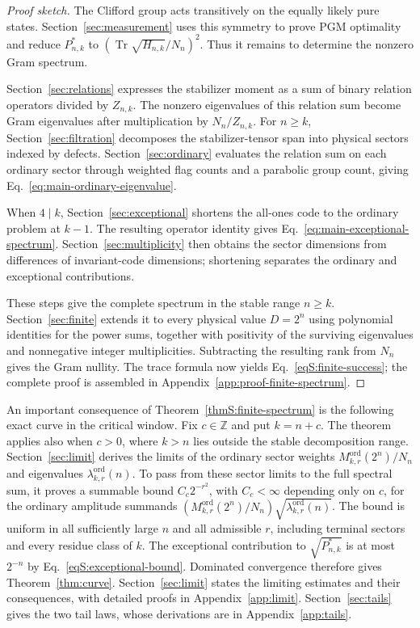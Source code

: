 \documentclass[journal,twocolumn]{IEEEtran}
\theoremstyle{definition}
\theoremstyle{plain}
\newcommand{\Tr}{\operatorname{Tr}}
\newcommand{\Ord}{\mathrm{ord}}
\begin{document}
\begin{proof}[Proof sketch]
The Clifford group acts transitively on the equally likely pure states.
Section~\ref{sec:measurement} uses this symmetry to prove PGM optimality
and reduce $P^*_{n,k}$ to $(\Tr\sqrt{H_{n,k}}/N_n)^2$.
Thus it remains to determine the nonzero Gram spectrum.

Section~\ref{sec:relations} expresses the stabilizer moment as a sum of
binary relation operators divided by $Z_{n,k}$.
The nonzero eigenvalues of this relation sum become Gram eigenvalues
after multiplication by $N_n/Z_{n,k}$.
For $n\geq k$, Section~\ref{sec:filtration} decomposes the
stabilizer-tensor span into physical sectors indexed by defects.
Section~\ref{sec:ordinary} evaluates the relation sum on each ordinary
sector through weighted flag counts and a parabolic group count, giving
Eq.~\eqref{eq:main-ordinary-eigenvalue}.

When $4\mid k$, Section~\ref{sec:exceptional} shortens the all-ones code
to the ordinary problem at $k-1$.  The resulting operator identity gives
Eq.~\eqref{eq:main-exceptional-spectrum}.
Section~\ref{sec:multiplicity} then obtains the sector dimensions from
differences of invariant-code dimensions; shortening separates the
ordinary and exceptional contributions.

These steps give the complete spectrum in the stable range $n\geq k$.
Section~\ref{sec:finite} extends it to every physical value $D=2^n$
using polynomial identities for the power sums, together with positivity
of the surviving eigenvalues and nonnegative integer multiplicities.
Subtracting the resulting rank from $N_n$ gives the Gram nullity.
The trace formula now yields Eq.~\eqref{eqS:finite-success}; the complete
proof is assembled in Appendix~\ref{app:proof-finite-spectrum}.
\end{proof}

An important consequence of Theorem~\ref{thmS:finite-spectrum} is the
following exact curve in the critical window.  Fix $c\in\mathbb Z$ and
put $k=n+c$.  The theorem applies also when $c>0$, where $k>n$ lies outside
the stable decomposition range.  Section~\ref{sec:limit} derives the limits
of the ordinary sector weights $M^{\Ord}_{k,r}(2^n)/N_n$ and eigenvalues
$\lambda^{\Ord}_{k,r}(n)$.  To pass from these sector limits to the full
spectral sum, it proves a summable bound $C_c2^{-r^2}$, with $C_c<\infty$
depending only on $c$, for the ordinary amplitude summands
$(M^{\Ord}_{k,r}(2^n)/N_n)\sqrt{\lambda^{\Ord}_{k,r}(n)}$.
The bound is uniform in all sufficiently large $n$ and all admissible $r$,
including terminal sectors and every residue class of $k$.
The exceptional contribution to $\sqrt{P^*_{n,k}}$ is at most $2^{-n}$
by Eq.~\eqref{eqS:exceptional-bound}.  Dominated convergence therefore
gives Theorem~\ref{thm:curve}.  Section~\ref{sec:limit} states the limiting
estimates and their consequences, with detailed proofs in
Appendix~\ref{app:limit}.  Section~\ref{sec:tails} gives the two tail
laws, whose derivations are in Appendix~\ref{app:tails}.
\end{document}
